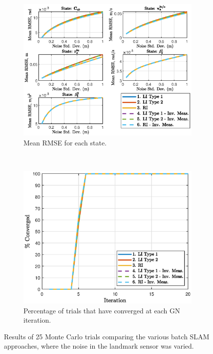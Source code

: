 \begin{figure}
	\centering
	\begin{subfigure}[b]{0.5\textwidth}
		\includegraphics[width=\textwidth]{figs/batch/landmark_rmse.eps}
		\caption{Mean RMSE for each state.}
	\end{subfigure}
	~
	\begin{subfigure}[b]{0.5\textwidth}
		\includegraphics[width=\textwidth]{figs/batch/landmark_perc.eps}
		\caption{Percentage of trials that have converged at each GN iteration.}
	\end{subfigure}
	\caption[Results comparing batch SLAM approaches vvarying landmark sensor noise.]{Results of 25 Monte Carlo trials comparing the various batch SLAM approaches, where the noise in the landmark sensor was varied.}
	\label{fig:batch_landmark}
\end{figure}  